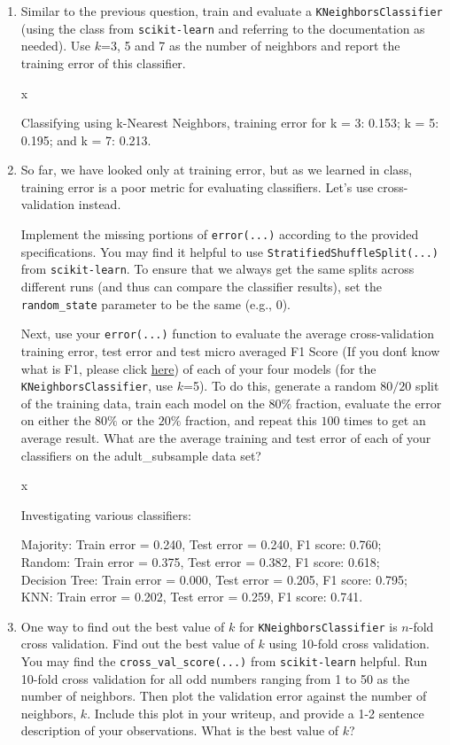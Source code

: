\begin{enumerate}[resume]
\item {} Similar to the previous question, train and evaluate a \verb|KNeighborsClassifier| (using the class from \verb|scikit-learn| and referring to the documentation as needed). Use $k$=3, 5 and 7 as the number of neighbors and report the training error of this classifier.

\sol x 

Classifying using k-Nearest Neighbors, training error for k = 3: 0.153; k = 5: 0.195; and k = 7: 0.213.

\item {} So far, we have looked only at training error, but as we learned in class, training error is a poor metric for evaluating classifiers. Let's use cross-validation instead.

Implement the missing portions of \verb|error(...)| according to the provided specifications. You may find it helpful to use \verb|StratifiedShuffleSplit(...)| from \verb|scikit-learn|. To ensure that we always get the same splits across different runs (and thus can compare the classifier results), set the \verb|random_state| parameter to be the same (e.g., 0).


Next, use your \verb|error(...)| function to evaluate the average cross-validation training error, test error and test micro averaged F1 Score (If you don\'t know what is F1, please click \href{https://scikit-learn.org/stable/modules/generated/sklearn.metrics.f1_score.html?highlight=f1\%20score#sklearn.metrics.f1_score}{here}) of each of your four models (for the \verb|KNeighborsClassifier|, use $k$=5). To do this, generate a random $80/20$ split of the training data, train each model on the $80\%$ fraction, evaluate the error on either the $80\%$ or the $20\%$ fraction, and repeat this $100$ times to get an average result. What are the average training and test error of each of your classifiers on the adult\_subsample data set?

\sol x 

Investigating various classifiers:

Majority: Train error = 0.240, Test error = 0.240, F1 score: 0.760; \\
Random: Train error = 0.375, Test error = 0.382, F1 score: 0.618; \\
Decision Tree: Train error = 0.000, Test error = 0.205, F1 score: 0.795; \\
KNN: Train error = 0.202, Test error = 0.259, F1 score: 0.741.

\item {} One way to find out the best value of $k$ for \verb|KNeighborsClassifier| is $n$-fold cross validation.
Find out the best value of $k$ using 10-fold cross validation. You may find the \verb|cross_val_score(...)| from \verb|scikit-learn| helpful. Run 10-fold cross validation for all odd numbers ranging from 1 to 50 as the number of neighbors.
Then plot the validation error against the number of neighbors, $k$.
Include this plot in your writeup, and provide a 1-2 sentence description of your observations. What is the best value of $k$?


\end{enumerate}
